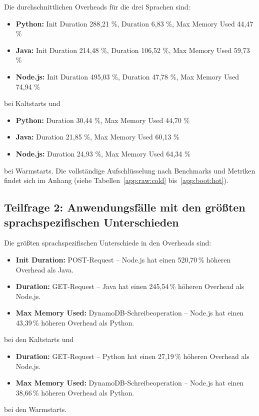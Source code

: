 Die durchschnittlichen Overheads für die drei Sprachen sind:
\begin{itemize}
\item \textbf{Python:} Init Duration 288,21 \%, Duration 6,83 \%, Max Memory Used 44,47 \%
\item \textbf{Java:} Init Duration 214,48 \%, Duration 106,52 \%, Max Memory Used 59,73 \%
\item \textbf{Node.js:} Init Duration 495,03 \%, Duration 47,78 \%, Max Memory Used 74,94 \%
\end{itemize}
bei Kaltstarts und 
\begin{itemize}
\item \textbf{Python:} Duration 30,44 \%, Max Memory Used 44,70 \%
\item \textbf{Java:} Duration 21,85 \%, Max Memory Used 60,13 \%
\item \textbf{Node.js:} Duration 24,93 \%, Max Memory Used 64,34 \%
\end{itemize}
bei Warmstarts.
Die vollständige Aufschlüsselung nach Benchmarks und Metriken findet sich im Anhang (siehe Tabellen~\ref{app:raw:cold} bis~\ref{app:boot:hot}).

\subsection{Teilfrage 2: Anwendungsfälle mit den größten sprachspezifischen Unterschieden}
Die größten sprachspezifischen Unterschiede in den Overheads sind:
\begin{itemize}
    \item \textbf{Init Duration:} POST-Request – Node.js hat einen 520,70\,\% höheren Overhead als Java.
    \item \textbf{Duration:} GET-Request – Java hat einen 245,54\,\% höheren Overhead als Node.js.
    \item \textbf{Max Memory Used:} DynamoDB-Schreibeoperation – Node.js hat einen 43,39\,\% höheren Overhead als Python.
\end{itemize}
bei den Kaltstarts und \begin{itemize}
    \item \textbf{Duration:} GET-Request – Python hat einen 27,19\,\% höheren Overhead als Node.js.
    \item \textbf{Max Memory Used:} DynamoDB-Schreibeoperation – Node.js hat einen 38,66\,\% höheren Overhead als Python.
\end{itemize}
bei den Warmstarts.

